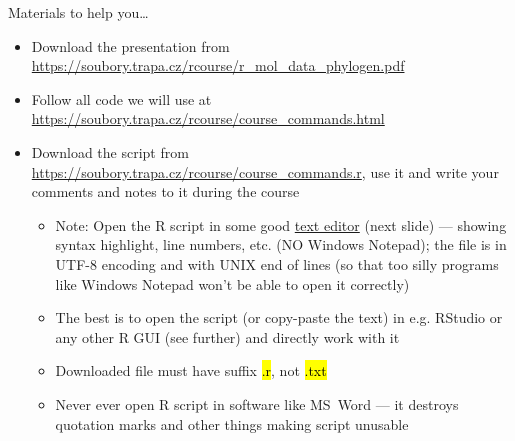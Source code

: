 \documentclass[compress, ucs, xelatex, 11pt, xcolor=svgnames,
  hyperref={
    bookmarks=true,
    unicode=true,
    colorlinks=true,
    pdftitle={Molecular data in R},
    plainpages=false,
    pdfauthor={Vojtech Zeisek},
    pdfsubject={Course about phylogeny and evolution in R},
    pdfcreator={XeLaTeX},
    pdfkeywords={R, evolution, phylogeny, molecular data},
    linkcolor=Tomato,
    anchorcolor=SaddleBrown,
    citecolor=Goldenrod,
    filecolor=DarkMagenta,
    menucolor=Sienna,
    urlcolor=DarkTurquoise,
    pdftex},
  url={hyphens, lowtilde} %
  ]{beamer}
\renewcommand{\texttt}[1]{\hl{\ttfamily #1}}
\begin{document}
\begin{frame}{Materials to help you\ldots}
  \begin{itemize}
    \item Download the presentation from \url{https://soubory.trapa.cz/rcourse/r_mol_data_phylogen.pdf}
    \item Follow all code we will use at \url{https://soubory.trapa.cz/rcourse/course_commands.html}
    \item Download the script from \url{https://soubory.trapa.cz/rcourse/course_commands.r}, use it and write your comments and notes to it during the course
    \begin{itemize}
      \item \alert{Note:} Open the R script in some \alert{good} \href{http://texteditors.org/cgi-bin/wiki.pl?PickingATextEditor}{text editor} (next slide) --- showing syntax highlight, line numbers, etc. (\alert{NO} Windows Notepad); the file is in UTF-8 encoding and with UNIX end of lines (so that too silly programs like Windows Notepad won't be able to open it correctly)
      \item The best is to open the script (or copy-paste the text) in e.g. RStudio or any other R GUI (see further) and directly work with it
      \item \alert{Downloaded file must have suffix \texttt{*.r}, not \texttt{*.txt}}
      \item \alert{Never ever} open R script in software like MS~Word --- it destroys quotation marks and other things making script unusable
    \end{itemize}
  \end{itemize}
\end{frame}
\end{document}
